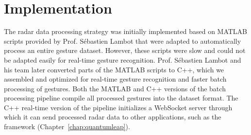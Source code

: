 \section{Implementation} \label{sec:radar-challenges:implementation}
The radar data processing strategy was initially implemented based on MATLAB scripts provided by Prof. Sébastien Lambot that were adapted to automatically process an entire gesture dataset. However, these scripts were slow and could not be adapted easily for real-time gesture recognition.
%
Prof. Sébastien Lambot and his team later converted parts of the MATLAB scripts to C++, which we assembled and optimized for real-time gesture recognition and faster batch processing of gestures.
Both the MATLAB and C++ versions of the batch processing pipeline compile all processed gestures into the \ql dataset format. 
The C++ real-time version of the pipeline initializes a WebSocket server through which it can send processed radar data to other applications, such as the \ql framework (Chapter~\ref{chap:quantumleap}).

